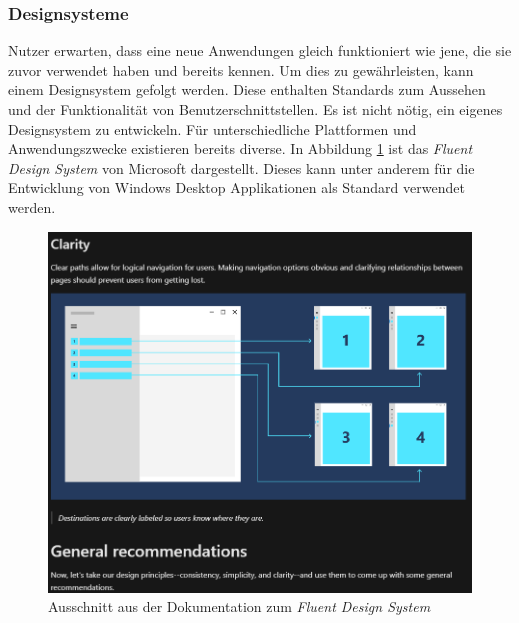 \subsubsection{Designsysteme}
Nutzer erwarten, dass eine neue Anwendungen gleich funktioniert wie jene, die sie zuvor verwendet haben und bereits kennen.
Um dies zu gewährleisten, kann einem Designsystem gefolgt werden.
Diese enthalten Standards zum Aussehen und der Funktionalität von Benutzerschnittstellen.
Es ist nicht nötig, ein eigenes Designsystem zu entwickeln.
Für unterschiedliche Plattformen und Anwendungszwecke existieren bereits diverse.
In Abbildung \ref{fig:fluent} ist das \textit{Fluent Design System} von Microsoft dargestellt.
Dieses kann unter anderem für die Entwicklung von Windows Desktop Applikationen als Standard verwendet werden.
\begin{figure}[H]
   \centering
   \includegraphics[width=1.0\textwidth]{gfx/design_system_ms.png}
   \caption{
      Ausschnitt aus der Dokumentation zum \textit{Fluent Design System}
   }
   \label{fig:fluent}
\end{figure}